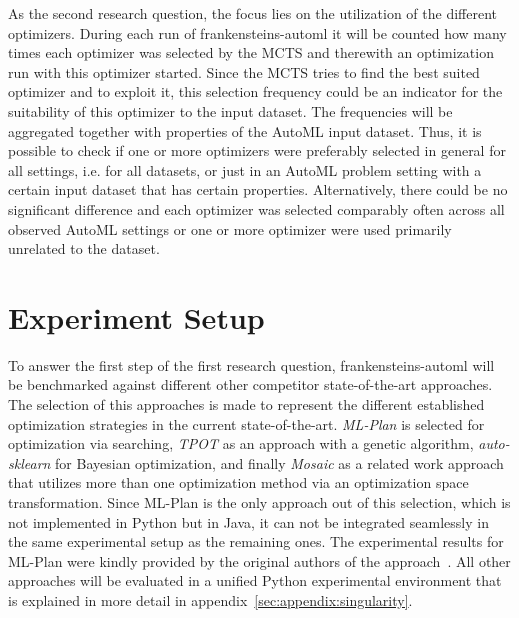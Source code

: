 As the second research question, the focus lies on the utilization of the different optimizers.
During each run of frankensteins-automl it will be counted how many times each optimizer was selected by the MCTS and therewith an optimization run with this optimizer started.
Since the MCTS tries to find the best suited optimizer and to exploit it, this selection frequency could be an indicator for the suitability of this optimizer to the input dataset.\newline
The frequencies will be aggregated together with properties of the AutoML input dataset.
Thus, it is possible to check if one or more optimizers were preferably selected in general for all settings, i.e. for all datasets, or just in an AutoML problem setting with a certain input dataset that has certain properties.
Alternatively, there could be no significant difference and each optimizer was selected comparably often across all observed AutoML settings or one or more optimizer were used primarily unrelated to the dataset.

\section{Experiment Setup}
\label{sec:evaluation:setup}
To answer the first step of the first research question, frankensteins-automl will be benchmarked against different other competitor state-of-the-art approaches.
The selection of this approaches is made to represent the different established optimization strategies in the current state-of-the-art.\newline
\textit{ML-Plan} is selected for optimization via searching, \textit{TPOT} as an approach with a genetic algorithm, \textit{auto-sklearn} for Bayesian optimization, and finally \textit{Mosaic} as a related work approach that utilizes more than one optimization method via an optimization space transformation.\newline
Since ML-Plan is the only approach out of this selection, which is not implemented in Python but in Java, it can not be integrated seamlessly in the same experimental setup as the remaining ones.
The experimental results for ML-Plan were kindly provided by the original authors of the approach~\textcite{Mohr-ML-Plan}.
All other approaches will be evaluated in a unified Python experimental environment that is explained in more detail in appendix~\ref{sec:appendix:singularity}.

